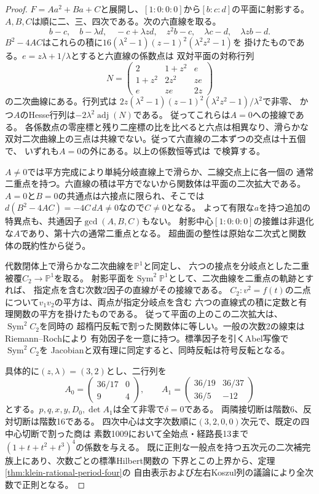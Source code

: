 \begin{proof}
$F=Aa^2+Ba+C$と展開し、$[1:0:0:0]$から$[b:c:d]$の平面に射影する。
$A,B,C$は順に二、三、四次である。次の六直線を取る。
\[
 b-c,\quad b-\lambda d,\quad -c+\lambda z d,\quad z^2 b-c,\quad
 \lambda c-d,\quad \lambda z b-d .
\]
$B^2-4AC$はこれらの積に$16(\lambda^2-1)(z-1)^2(\lambda^2z^2-1)$を
掛けたものである。$e=z\lambda+1/\lambda$とすると六直線の係数点は
双対平面の対称行列
\[
 N=\begin{pmatrix}
 2&1+z^2&e\\
 1+z^2&2z^2&ze\\
 e&ze&2z
 \end{pmatrix}
\]
の二次曲線にある。行列式は
$2z(\lambda^2-1)(z-1)^2(\lambda^2z^2-1)/\lambda^2$で非零、
かつ$A$のHesse行列は$-2\lambda^2\operatorname{adj}(N)$である。
従ってこれらは$A=0$への接線である。
各係数点の零座標と残り二座標の比を比べると六点は相異なり、滑らかな
双対二次曲線上の三点は共線でない。従って六直線の二本ずつの交点は十五個で、
いずれも$A=0$の外にある。以上の係数恒等式は
で検算する。

$A\ne0$では平方完成により単純分岐直線上で滑らか、二線交点上に各一個の
通常二重点を持つ。六直線の積は平方でないから関数体は平面の二次拡大である。
$A=0$と$B=0$の共通点は六接点に限られ、そこでは
$d(B^2-4AC)=-4C\,dA\ne0$なので$C\ne0$となる。
よって有限な$a$を持つ追加の特異点も、共通因子$\gcd(A,B,C)$もない。
射影中心$[1:0:0:0]$の接錐は非退化な$A$であり、第十六の通常二重点となる。
超曲面の整性は原始な二次式と関数体の既約性から従う。

代数閉体上で滑らかな二次曲線を$\mathbb P^1$と同定し、
六つの接点を分岐点とした二重被覆$C_2\to\mathbb P^1$を取る。
射影平面を$\operatorname{Sym}^2\mathbb P^1$として、二次曲線を二重点の軌跡とすれば、
指定点を含む次数2因子の直線がその接線である。
$C_2:v^2=f(t)$の二点について$v_1v_2$の平方は、両点が指定分岐点を含む
六つの直線式の積に定数と有理関数の平方を掛けたものである。
従って平面の上のこの二次拡大は、$\operatorname{Sym}^2 C_2$を同時の
超楕円反転で割った関数体に等しい。一般の次数2の線束はRiemann--Rochにより
有効因子を一意に持つ。標準因子を引くAbel写像で$\operatorname{Sym}^2 C_2$を
Jacobianと双有理に同定すると、同時反転は符号反転となる。

具体的に$(z,\lambda)=(3,2)$とし、二行列を
\[
 A_0=\begin{pmatrix}36/17&0\\9&4\end{pmatrix},\qquad
 A_1=\begin{pmatrix}36/19&36/37\\36/5&-12\end{pmatrix}
\]
とする。$p,q,x,y,D_0,\det A_1$は全て非零で$\delta=0$である。
両隣接切断は階数6、反対切断は階数16である。
四次中心は文字次数順に$(3,2,0,0)$次元で、既定の四中心切断で割った商は
素数1009において全始点・経路長13まで$(1+t+t^2+t^3)^4$の係数を与える。
既に正則な一般点を持つ五次元の二次補完族上にあり、次数ごとの標準Hilbert関数の
下界とこの上界から、定理\ref{thm:klein-rational-period-four}の
自由表示および左右Koszul列の議論により全次数で正則となる。


\end{proof}
